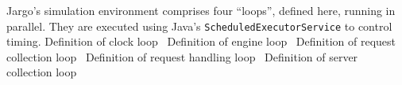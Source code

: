  Jargo's simulation environment comprises four ``loops'', defined
here, running in parallel. They are executed using Java's
{\tt{}ScheduledExecutorService} to control timing.
\nwenddocs{}\endmoddef{}
\LA{}Definition of clock loop~{\nwtagstyle{}}\RA{}
\LA{}Definition of engine loop~{\nwtagstyle{}}\RA{}
\LA{}Definition of request collection loop~{\nwtagstyle{}}\RA{}
\LA{}Definition of request handling loop~{\nwtagstyle{}}\RA{}
\LA{}Definition of server collection loop~{\nwtagstyle{}}\RA{}
\nwendcode{}\nwdocspar

